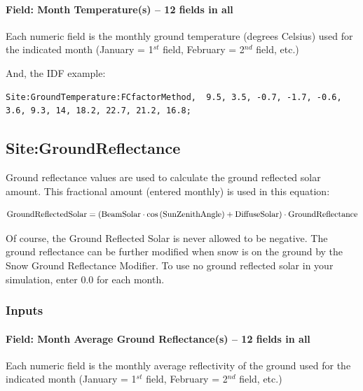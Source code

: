 \paragraph{Field: Month Temperature(s) -- 12 fields in all}\label{field-month-temperatures-12-fields-in-all-3}

Each numeric field is the monthly ground temperature (degrees Celsius) used for the indicated month (January = 1\(^{st}\) field, February = 2\(^{nd}\) field, etc.)

And, the IDF example:

\begin{lstlisting}
Site:GroundTemperature:FCfactorMethod,  9.5, 3.5, -0.7, -1.7, -0.6, 3.6, 9.3, 14, 18.2, 22.7, 21.2, 16.8;
\end{lstlisting}

\subsection{Site:GroundReflectance}\label{sitegroundreflectance}

Ground reflectance values are used to calculate the ground reflected solar amount. This fractional amount (entered monthly) is used in this equation:

\begin{equation}
\rm{GroundReflectedSolar} = \left( \rm{BeamSolar} \cdot cos \left( \rm{SunZenithAngle} \right) + \rm{DiffuseSolar} \right) \cdot \rm{GroundReflectance}
\end{equation}

Of course, the Ground Reflected Solar is never allowed to be negative. The ground reflectance can be further modified when snow is on the ground by the Snow Ground Reflectance Modifier. To use no ground reflected solar in your simulation, enter 0.0 for each month.

\subsubsection{Inputs}\label{inputs-19-003}

\paragraph{Field: Month Average Ground Reflectance(s) -- 12 fields in all}\label{field-month-average-ground-reflectances-12-fields-in-all}

Each numeric field is the monthly average reflectivity of the ground used for the indicated month (January = 1\(^{st}\) field, February = 2\(^{nd}\) field, etc.)

